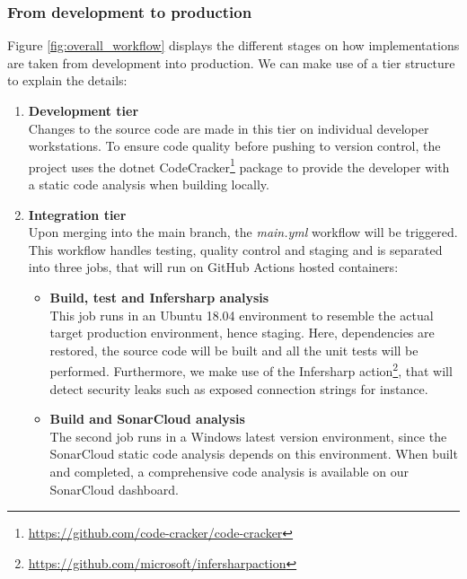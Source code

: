 \documentclass[report/main.tex]{subfiles}
\begin{document}
            \newpage 
            
            \subsubsection{From development to production}
                Figure \ref{fig:overall_workflow} displays the different stages on how implementations are taken from development into production. We can make use of a tier structure to explain the details:
            
        
        \begin{enumerate}
            \item \textbf{Development tier} \\
            Changes to the source code are made in this tier on individual developer workstations. To ensure code quality before pushing to version control, the project uses the dotnet CodeCracker\footnote{\hyperlink{CodeCracker}{https://github.com/code-cracker/code-cracker}} package to provide the developer with a static code analysis when building locally. 
            
            \item \textbf{Integration tier} \\
            Upon merging into the main branch, the \textit{main.yml} workflow will be triggered. This workflow handles testing, quality control and staging and is separated into three jobs, that will run on GitHub Actions hosted containers: 
            
            \begin{itemize}
                \item \textbf{Build, test and Infersharp analysis} \\
                This job runs in an Ubuntu 18.04 environment to resemble the actual target production environment, hence staging. Here, dependencies are restored, the source code will be built and all the unit tests will be performed. Furthermore, we make use of the Infersharp action\footnote{\hyperlink{Infersharp action}{https://github.com/microsoft/infersharpaction}}, that will detect security leaks such as exposed connection strings for instance.  
                
                \item \textbf{Build and SonarCloud analysis} \\
                The second job runs in a Windows latest version environment, since the SonarCloud static code analysis depends on this environment. When built and completed, a comprehensive code analysis is available on our SonarCloud dashboard. 
                

\end{itemize}
\end{enumerate}
\end{document}
